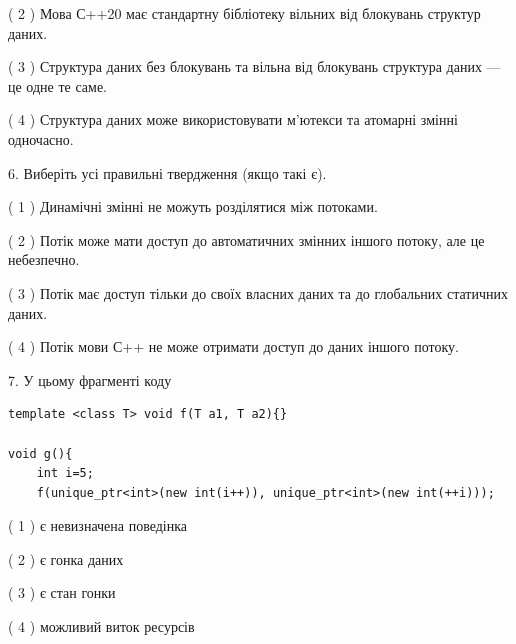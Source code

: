 \documentclass[12pt, ukrainian]{article}
\begin{document}
\begin {large}
{( 2 ) Мова С++20 має стандартну бібліотеку вільних від блокувань структур даних.%

( 3 ) Структура даних без блокувань та вільна від блокувань структура даних --- це одне те саме.%

( 4 ) Структура даних може використовувати м’ютекси та атомарні змінні одночасно.%
\newpage



\vspace{5mm}
6. Виберіть усі правильні твердження (якщо такі є).\par
\vspace{2mm}

( 1 ) Динамічні змінні не можуть розділятися між потоками.%

( 2 ) Потік може мати доступ до автоматичних змінних іншого потоку, але це небезпечно.%

( 3 ) Потік має доступ тільки до своїх власних даних та до глобальних статичних даних.%

( 4 ) Потік мови С++ не може отримати доступ до даних іншого потоку.%


\vspace{5mm}
7. У цьому фрагменті коду
\begin{verbatim}
template <class T> void f(T a1, T a2){}

void g(){
    int i=5;
    f(unique_ptr<int>(new int(i++)), unique_ptr<int>(new int(++i)));
\end{verbatim}

( 1 ) є невизначена поведінка%

( 2 ) є гонка даних%

( 3 ) є стан гонки%

( 4 ) можливий виток ресурсів%
}
\end {large}
\end{document}
